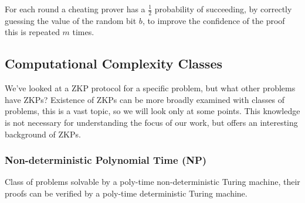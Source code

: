 \noindent For each round a cheating prover has a $\frac{1}{2}$ probability of succeeding, by correctly guessing the value of the random bit $b$, to improve the confidence of the proof this is repeated $m$ times.

%

\subsection{Computational Complexity Classes}
We've looked at a ZKP protocol for a specific problem, but what other problems have ZKPs?
Existence of ZKPs can be more broadly examined with classes of problems, this is a vast topic, so we will look only at some points. 
This knowledge is not necessary for understanding the focus of our work, but offers an interesting background of ZKPs.

\subsubsection{Non-deterministic Polynomial Time (NP)}


Class of problems solvable by a poly-time non-deterministic Turing machine, their proofs can be verified by a poly-time deterministic Turing machine.

